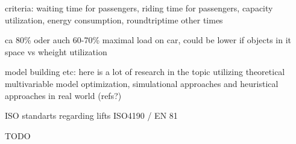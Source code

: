 criteria: waiting time for passengers, riding time for passengers, capacity utilization, energy consumption, roundtriptime other times

ca 80\% oder auch 60-70\% maximal load on car, could be lower if objects in it
space vs wheight utilization

model building etc: here is a lot of research in the topic utilizing theoretical multivariable model optimization, simulational approaches and heuristical approaches in real world (refs?)

ISO standarts regarding lifts ISO4190 / EN 81

TODO
